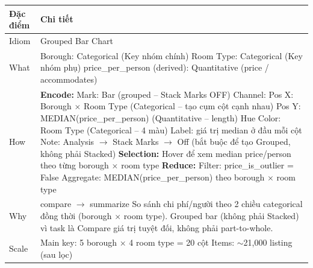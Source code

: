 \begin{longtable}{|p{2.8cm}|p{11.5cm}|}
\hline
\textbf{Đặc điểm} & \textbf{Chi tiết} \\
\hline
\endhead
\hline
\endfoot
Idiom & Grouped Bar Chart \\
\hline
What & Borough: Categorical (Key nhóm chính) \newline
Room Type: Categorical (Key nhóm phụ) \newline
price\_per\_person (derived): Quantitative (price / accommodates) \\
\hline
How & \textbf{Encode:} \newline
\newline
Mark: Bar (grouped -- Stack Marks OFF) \newline
Channel: \newline
\hspace{0.3cm} Pos X: Borough $\times$ Room Type (Categorical -- tạo cụm cột cạnh nhau) \newline
\hspace{0.3cm} Pos Y: MEDIAN(price\_per\_person) (Quantitative -- length) \newline
\hspace{0.3cm} Hue Color: Room Type (Categorical -- 4 màu) \newline
\hspace{0.3cm} Label: giá trị median ở đầu mỗi cột \newline
Note: Analysis $\rightarrow$ Stack Marks $\rightarrow$ Off (bắt buộc để tạo Grouped, không phải Stacked) \newline
\newline
\textbf{Selection:} \newline
\newline
Hover để xem median price/person theo từng borough $\times$ room type \newline
\newline
\textbf{Reduce:} \newline
\newline
Filter: price\_is\_outlier = False \newline
Aggregate: MEDIAN(price\_per\_person) theo borough $\times$ room type \\
\hline
Why & compare $\rightarrow$ summarize \newline
So sánh chi phí/người theo 2 chiều categorical đồng thời (borough $\times$ room type). Grouped bar (không phải Stacked) vì task là Compare giá trị tuyệt đối, không phải part-to-whole. \\
\hline
Scale & Main key: 5 borough $\times$ 4 room type = 20 cột \newline
Items: $\sim$21,000 listing (sau lọc) \\
\hline
\end{longtable}

